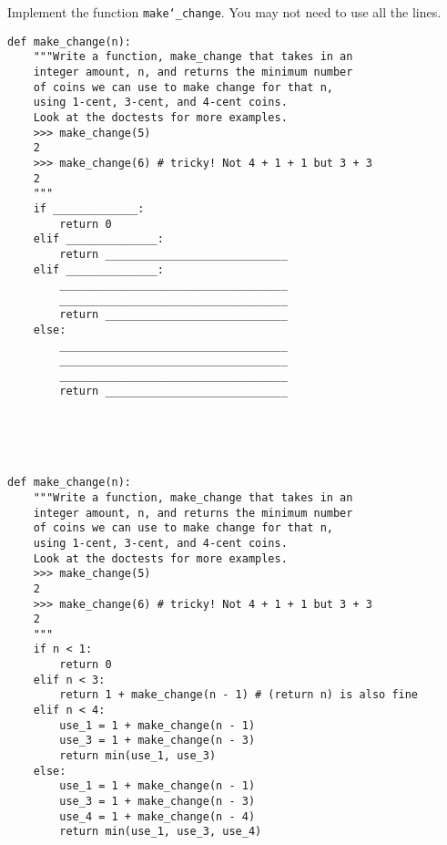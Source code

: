 \begin{blocksection}
\question Implement the function \texttt{make\char`_change}. You may not need to use all the lines.\\

\begin{lstlisting}
def make_change(n):
    """Write a function, make_change that takes in an
    integer amount, n, and returns the minimum number
    of coins we can use to make change for that n, 
    using 1-cent, 3-cent, and 4-cent coins. 
    Look at the doctests for more examples.
    >>> make_change(5)
    2
    >>> make_change(6) # tricky! Not 4 + 1 + 1 but 3 + 3
    2
    """
    if _____________:
        return 0
    elif ______________:
        return ____________________________
    elif ______________:
        ___________________________________
        ___________________________________
        return ____________________________
    else:
        ___________________________________
        ___________________________________
        ___________________________________
        return ____________________________


\end{lstlisting}

\end{blocksection}
\\ \\
\begin{blocksection}

\begin{solution}[1in]
\begin{lstlisting}
def make_change(n):
    """Write a function, make_change that takes in an
    integer amount, n, and returns the minimum number
    of coins we can use to make change for that n, 
    using 1-cent, 3-cent, and 4-cent coins. 
    Look at the doctests for more examples.
    >>> make_change(5)
    2
    >>> make_change(6) # tricky! Not 4 + 1 + 1 but 3 + 3
    2
    """
    if n < 1:
        return 0
    elif n < 3:
        return 1 + make_change(n - 1) # (return n) is also fine
    elif n < 4:
        use_1 = 1 + make_change(n - 1)
        use_3 = 1 + make_change(n - 3)
        return min(use_1, use_3)
    else:
        use_1 = 1 + make_change(n - 1)
        use_3 = 1 + make_change(n - 3)
        use_4 = 1 + make_change(n - 4)
        return min(use_1, use_3, use_4)
\end{lstlisting}
\end{solution}
\end{blocksection}
